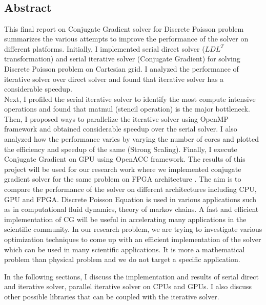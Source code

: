 \documentclass{article}
\title{\vspace{2in}\textmd{\textbf{\hmwkClass}} \\
\vspace{0.1in}\large{ \hmwkClassTime}\vspace{3in}}
\author{\textbf{\hmwkAuthorName} \\ \vspace{0.1in}
\hmwkDueDate }
\date{} %
\begin{document}
\begin{spacing}{1.1}
\maketitle

\newpage
\section*{Abstract}



This final report on Conjugate Gradient solver for Discrete Poisson problem summarizes the various attempts to improve the performance of the solver on different platforms.
Initially, I implemented serial direct solver ($LDL^T$ transformation) and serial iterative solver (Conjugate Gradient) for solving Discrete Poisson problem on Cartesian grid. I analyzed the performance of iterative solver over direct solver and found that iterative solver has a considerable speedup. \\
Next, I profiled the serial iterative solver to identify the most compute intensive operations and found that matmul (stencil operation) is the major bottleneck. Then, I proposed ways to parallelize the iterative solver using OpenMP framework and obtained considerable speedup over the serial solver. I also analyzed how the performance varies by varying the number of cores and plotted the efficiency and speedup of the same (Strong Scaling). Finally, I execute Conjugate Gradient on GPU using OpenACC framework.  The results of this project will be used for our research work where we implemented conjugate gradient solver for the same problem on FPGA architecture \cite{FPGACG}. The aim is to compare the performance of the solver on different architectures including CPU, GPU and FPGA. Discrete Poisson Equation is used in various applications such as in computational fluid dynamics, theory of markov chains. A fast and efficient implementation of CG will be useful in accelerating many applications in the scientific community. In our research problem, we are trying to investigate various optimization techniques to come up with an efficient implementation of the solver which can be used in many scientific applications. It is more a mathematical problem than physical problem and we do not target a specific application.

In the following sections, I discuss the implementation and results of serial direct and iterative solver, parallel iterative solver on CPUs and GPUs. I also discuss other possible libraries that can be coupled with the iterative solver. 




\end{spacing}
\end{document}
